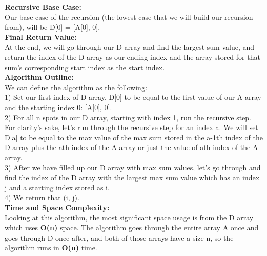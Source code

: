 \documentclass[11pt, solution, letterpaper]{format}
\begin{document}
\textbf{Recursive Base Case:}\\
Our base case of the recursion (the lowest case that we will build our recursion from), will be D[0] = [A[0], 0]. \\

\textbf{Final Return Value:}\\
At the end, we will go through our D array and find the largest sum value, and return the index of the D array as our ending index and the array stored for that sum's corresponding start index as the start index.\\

\textbf{Algorithm Outline:}\\
We can define the algorithm as the following:\\
1) Set our first index of D array, D[0] to be equal to the first value of our A array and the starting index 0: [A[0], 0]. \\ 
2) For all n spots in our D array, starting with index 1, run the recursive step. \\ For clarity's sake, let's run through the recursive step for an index a. We will set D[a] to be equal to the max value of the max sum stored in the a-1th index of the D array plus the ath index of the A array or just the value of ath index of the A array.  \\
3) After we have filled up our D array with max sum values, let's go through and find the index of the D array with the largest max sum value which has an index j and a starting index stored as i. \\
4) We return that (i, j).\\

\textbf{Time and Space Complexity:}\\
Looking at this algorithm, the most significant space usage is from the D array which uses \textbf{O(n)} space. The algorithm goes through the entire array A once and goes through D once after, and both of those arrays have a size n, so the algorithm runs in \textbf{O(n)} time.\\
\end{document}
